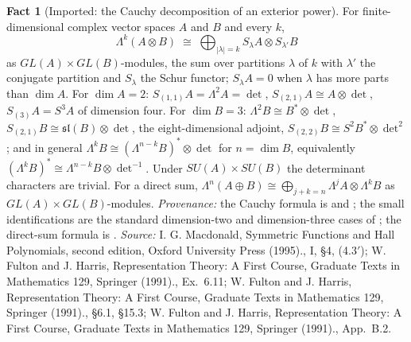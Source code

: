 \documentclass[11pt]{article}
\theoremstyle{definition}
\newtheorem{fact}[theorem]{Fact}
\theoremstyle{plain}
\begin{document}
\begin{fact}[Imported: the Cauchy decomposition of an exterior power]\label{c:standard-model.imported-cauchy-decomposition-exterior-power}
For finite-dimensional complex vector spaces $A$ and $B$ and every $k$,
\[
\Lambda^{k}(A \otimes B) \;\cong\; \bigoplus_{|\lambda| = k} S_{\lambda}A \otimes S_{\lambda'}B
\]
as $GL(A) \times GL(B)$-modules, the sum over partitions $\lambda$ of $k$ with $\lambda'$ the conjugate partition and $S_{\lambda}$ the Schur functor; $S_{\lambda}A = 0$ when $\lambda$ has more parts than $\dim A$. For $\dim A = 2$: $S_{(1,1)}A = \Lambda^{2}A = \det$, $S_{(2,1)}A \cong A \otimes \det$, $S_{(3)}A = S^{3}A$ of dimension four. For $\dim B = 3$: $\Lambda^{2}B \cong B^{*} \otimes \det$, $S_{(2,1)}B \cong \mathfrak{sl}(B) \otimes \det$, the eight-dimensional adjoint, $S_{(2,2)}B \cong S^{2}B^{*} \otimes \det^{2}$; and in general $\Lambda^{k}B \cong (\Lambda^{n-k}B)^{*} \otimes \det$ for $n = \dim B$, equivalently $(\Lambda^{k}B)^{*} \cong \Lambda^{n-k}B \otimes \det^{-1}$. Under $SU(A) \times SU(B)$ the determinant characters are trivial. For a direct sum, $\Lambda^{n}(A \oplus B) \cong \bigoplus_{j+k=n}\Lambda^{j}A \otimes \Lambda^{k}B$ as $GL(A) \times GL(B)$-modules. \emph{Provenance:} the Cauchy formula is \cite[I, \S 4, (4.3$'$)]{Macdonald1995} and \cite[Ex.~6.11]{FultonHarris1991}; the small identifications are the standard dimension-two and dimension-three cases of \cite[\S 6.1, \S 15.3]{FultonHarris1991}; the direct-sum formula is \cite[App.~B.2]{FultonHarris1991}.
\emph{Source:} I. G. Macdonald, Symmetric Functions and Hall Polynomials, second edition, Oxford University Press (1995)., I, \S 4, (4.3$'$); W. Fulton and J. Harris, Representation Theory: A First Course, Graduate Texts in Mathematics 129, Springer (1991)., Ex.~6.11; W. Fulton and J. Harris, Representation Theory: A First Course, Graduate Texts in Mathematics 129, Springer (1991)., \S 6.1, \S 15.3; W. Fulton and J. Harris, Representation Theory: A First Course, Graduate Texts in Mathematics 129, Springer (1991)., App.~B.2.
\end{fact}
\end{document}
